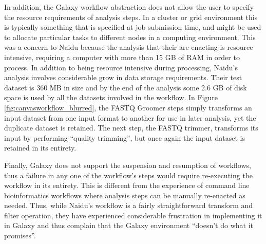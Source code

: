 \documentclass[a4paper,10pt]{scrreprt} \usepackage[utf8]{inputenc}
\begin{document}
In addition, the Galaxy workflow abstraction does not allow the user to specify the resource requirements of analysis steps. In a cluster or grid environment this is typically something that is specified at job submission time, and might be used to allocate particular tasks to different nodes in a computing environment. This was a concern to Naidu because the analysis that their are enacting is resource intensive, requiring a computer with more than 15 GB of RAM in order to process. In addition to being resource intensive during processing, Naidu's analysis involves considerable grow in data storage requirements. Their test dataset is 360 MB in size and by the end of the analysis some 2.6 GB of disk space is used by all the datasets involved in the workflow. In Figure \ref{fig:canvasworkflow_blurred}, the FASTQ Groomer steps simply transforms an input dataset from one input format to another for use in later analysis, yet the duplicate dataset is retained. The next step, the FASTQ trimmer, transforms its 
input by performing ``quality trimming'', but once again the input dataset is retained in its entirety.

Finally, Galaxy does not support the suspension and resumption of workflows, thus a failure in any one of the workflow's steps would require re-executing the workflow in its entirety. This is different from the experience of command line bioinformatics workflows where analysis steps can be manually re-enacted as needed. Thus, while Naidu's workflow is a fairly straightforward transform and filter operation, they have experienced considerable frustration in implementing it in Galaxy and thus complain that the Galaxy environment ``doesn't do what it promises''.
\end{document}
